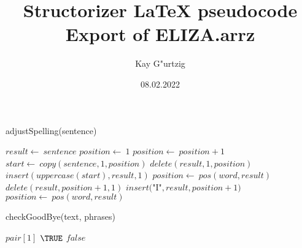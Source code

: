 \documentclass[a4paper,10pt]{article}
\title{Structorizer LaTeX pseudocode Export of ELIZA.arrz}
\author{Kay G"urtzig}
\date{08.02.2022}
\begin{document}
\begin{algorithm}
\caption{adjustSpelling(sentence)}
\begin{algorithmic}[5]

\STATE {}
  \STATE \(result\gets\ sentence\)
  \STATE \(position\gets\ 1\)
    \STATE \(position\gets\ position+1\)
  \ENDWHILE
    \STATE \(start\gets\ copy(sentence,1,position)\)
    \STATE \(delete(result,1,position)\)
    \STATE \(insert(uppercase(start),result,1)\)
  \ENDIF
    \STATE \(position\gets\ pos(word,result)\)
      \STATE \(delete(result,position+1,1)\)
      \STATE \(insert(\)"{}I"{}\(,result,position+1)\)
      \STATE \(position\gets\ pos(word,result)\)
    \ENDWHILE
  \ENDFOR

\end{algorithmic}
\end{algorithm}


\begin{algorithm}
\caption{checkGoodBye(text, phrases)}
\begin{algorithmic}[5]

\STATE {}
\STATE {}
\STATE {}
\STATE {}
      \PRINT\(pair[1]\)
      \RETURN\(\TRUE\)
    \ENDIF
  \ENDFOR
  \RETURN\(false\)

\end{algorithmic}
\end{algorithm}
\end{document}
